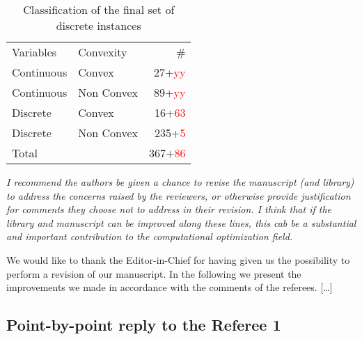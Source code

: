 \documentclass[11pt]{article}
\newcommand{\rep}[1]{{\textcolor{acblue}{#1}}}
\begin{document}

\begin{table}
 \centering
 \setlength{\tabcolsep}{18pt}
 \renewcommand \arraystretch{1.1}
\begin{tabular}{llr}
\toprule
Variables & Convexity & \#\\
\cmidrule(lr){1-3}
%
 Continuous	& Convex		&  27+\textcolor{red}{yy} \\[1.2 ex]
 Continuous	& Non Convex	&  89+\textcolor{red}{yy} \\[1.2 ex]
 Discrete	& Convex		&  16+\textcolor{red}{63} \\[1.2 ex]
 Discrete	& Non Convex	&  235+\textcolor{red}{5} \\[1.2 ex]
\cmidrule(lr){1-3}
Total		&				& 367+\textcolor{red}{86}\\
%
\bottomrule
\end{tabular}
\caption{Classification of the final set of discrete instances}
\label{tab:DD}
\end{table}



{\it
I recommend the authors be given a chance to revise the manuscript (and library) to address the concerns raised by the reviewers, or otherwise provide justification for comments they choose not to address in their revision. I think that if the library and manuscript can be improved along these lines, this cab be a substantial and important contribution to the computational optimization field. 
}


\rep{We would like to thank the Editor-in-Chief for having given us the possibility to perform a revision of our manuscript. In the following we present the improvements we made in accordance with the comments of the referees. [\dots] }




\subsection*{Point-by-point reply to the Referee 1}
\end{document}
